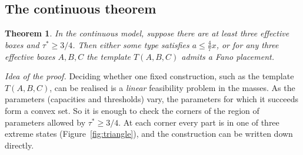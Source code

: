 \documentclass[11pt]{amsart}
\newtheorem{theorem}{Theorem}[section]
\theoremstyle{definition}
\theoremstyle{remark}
\begin{document}
\subsection{The continuous theorem}

\begin{theorem}\label{thm:threshold-cont}
In the continuous model, suppose there are at least three effective boxes and $\tau^*\ge 3/4$. Then either some type satisfies $a\le\frac47x$, or for any three effective boxes $A,B,C$ the template $T(A,B,C)$ admits a Fano placement.
\end{theorem}
\medskip\noindent\emph{Idea of the proof.} Deciding whether one fixed construction, such as the template $T(A,B,C)$, can be realised is a \emph{linear} feasibility problem in the masses. As the parameters (capacities and thresholds) vary, the parameters for which it succeeds form a convex set. So it is enough to check the corners of the region of parameters allowed by $\tau^*\ge3/4$. At each corner every part is in one of three extreme states (Figure~\ref{fig:triangle}), and the construction can be written down directly.
\end{document}
